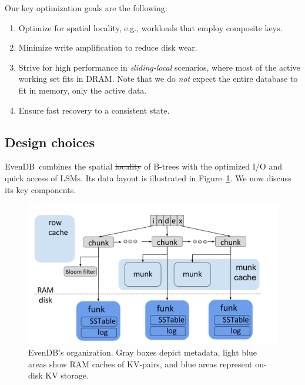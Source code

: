 \documentclass[sigplan,10pt]{acmart}
\newcommand{\remove}[1]{}
\newcommand{\sys}{EvenDB}
\providecommand{\DIFadd}[1]{{\protect\color{blue}\uwave{#1}}} %
\providecommand{\DIFdel}[1]{{\protect\color{red}\sout{#1}}}                      %
\providecommand{\DIFaddbegin}{} %
\providecommand{\DIFaddend}{} %
\providecommand{\DIFdelbegin}{} %
\providecommand{\DIFdelend}{} %
\begin{document}
Our key optimization goals are the following:
\begin{enumerate}
\item Optimize for {spatial locality}, e.g., workloads that employ composite keys.
\remove{
 Many NoSQL applications embed multi-dimensional data in a single-dimension composite key. 
 This design provides high spatial locality on the primary dimension (key prefix). We strive
 to express this locality in physical data organization.
 }

\item Minimize {write amplification}  to reduce disk wear.%

\item %
Strive for high performance in  \emph{sliding-local} scenarios, where most of the active working set fits in DRAM. 
Note that we do \emph{not} expect the entire database to fit in
memory, only the active data.  

\item Ensure {fast recovery} to a consistent state.  
\end{enumerate}

\subsection{Design choices}

\sys\ combines the spatial \DIFdelbegin \DIFdel{locality }\DIFdelend \DIFaddbegin \DIFadd{data partitioning }\DIFaddend of B-trees with the optimized I/O and quick access of LSMs. 
Its data layout is illustrated in Figure~\ref{fig:piwi}.  We now discuss its key components.   

\begin{figure}[tb]
\includegraphics[width=\columnwidth]{PiWi.png}
\caption{\sys's  organization. Gray boxes depict metadata, light blue areas show RAM caches of KV-pairs, and blue areas represent on-disk KV storage.}
\label{fig:piwi}
\end{figure}
\end{document}
